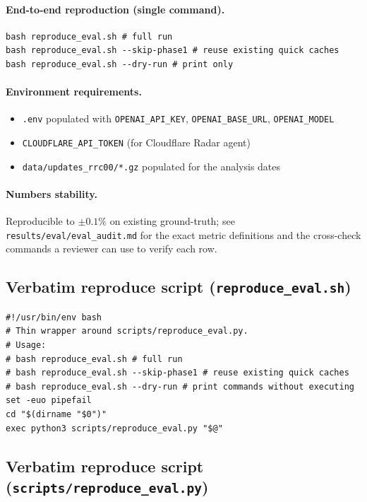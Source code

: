 \documentclass[sigcomm,nonatbib]{acmart}
\begin{document}
\paragraph{End-to-end reproduction (single command).}
\begin{verbatim}
bash reproduce_eval.sh # full run
bash reproduce_eval.sh --skip-phase1 # reuse existing quick caches
bash reproduce_eval.sh --dry-run # print only
\end{verbatim}

\paragraph{Environment requirements.}
\begin{itemize}
\item \texttt{.env} populated with \texttt{OPENAI\_API\_KEY},
\texttt{OPENAI\_BASE\_URL}, \texttt{OPENAI\_MODEL}
\item \texttt{CLOUDFLARE\_API\_TOKEN} (for Cloudflare Radar agent)
\item \texttt{data/updates\_rrc00/*.gz} populated for the analysis
dates
\end{itemize}

\paragraph{Numbers stability.} Reproducible to $\pm 0.1\%$ on
existing ground-truth; see \texttt{results/eval/eval\_audit.md} for
the exact metric definitions and the cross-check commands a reviewer
can use to verify each row.

\subsection{Verbatim reproduce script (\texttt{reproduce\_eval.sh})}

\begin{verbatim}
#!/usr/bin/env bash
# Thin wrapper around scripts/reproduce_eval.py.
# Usage:
# bash reproduce_eval.sh # full run
# bash reproduce_eval.sh --skip-phase1 # reuse existing quick caches
# bash reproduce_eval.sh --dry-run # print commands without executing
set -euo pipefail
cd "$(dirname "$0")"
exec python3 scripts/reproduce_eval.py "$@"
\end{verbatim}

\subsection{Verbatim reproduce script (\texttt{scripts/reproduce\_eval.py})}
\end{document}
